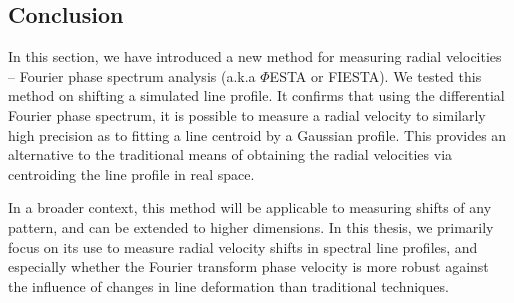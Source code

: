 %
%


\subsection{Conclusion}
In this section, we have introduced a new method for measuring radial velocities -- Fourier phase spectrum analysis (a.k.a $\mathit{\Phi}$ESTA or FIESTA). We tested this method on shifting a simulated line profile. It confirms that using the differential Fourier phase spectrum, it is possible to measure a radial velocity to similarly high precision as to fitting a line centroid by a Gaussian profile. This provides an alternative to the traditional means of obtaining the radial velocities via centroiding the line profile in real space. 

In a broader context, this method will be applicable to measuring shifts of any pattern, and can be extended to higher dimensions. In this thesis, we primarily focus on its use to measure radial velocity shifts in spectral line profiles, and especially whether the Fourier transform phase velocity is more robust against the influence of changes in line deformation than traditional techniques.

\pagebreak

